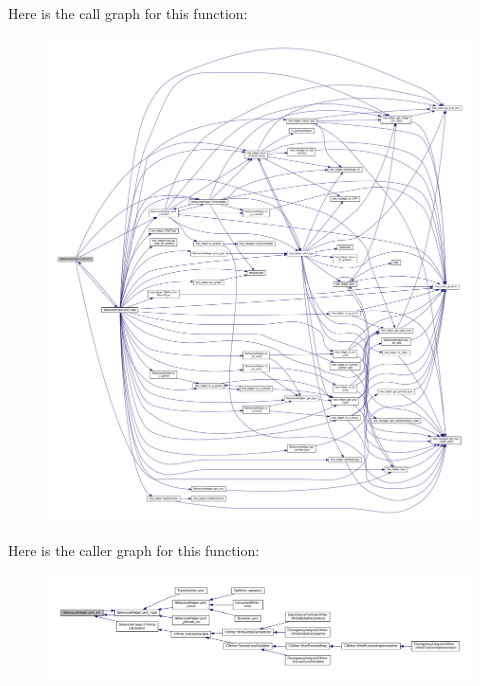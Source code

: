 Here is the call graph for this function\+:
\nopagebreak
\begin{figure}[H]
\begin{center}
\leavevmode
\includegraphics[width=350pt]{dd/db2/classBehavioralHelper_a23b0ff2925b78cc7a7714a51ac1c434b_cgraph}
\end{center}
\end{figure}
Here is the caller graph for this function\+:
\nopagebreak
\begin{figure}[H]
\begin{center}
\leavevmode
\includegraphics[width=350pt]{dd/db2/classBehavioralHelper_a23b0ff2925b78cc7a7714a51ac1c434b_icgraph}
\end{center}
\end{figure}
\mbox{\label{classBehavioralHelper_a63abf8a92b3fe000ca65a322df34bbd4}} 
